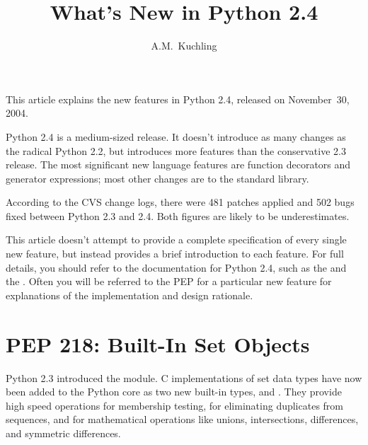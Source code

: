 \documentclass{howto}
\title{What's New in Python 2.4}
\author{A.M.\ Kuchling}
\begin{document}
\maketitle
\tableofcontents

This article explains the new features in Python 2.4, released on
November~30, 2004.

Python 2.4 is a medium-sized release.  It doesn't introduce as many
changes as the radical Python 2.2, but introduces more features than
the conservative 2.3 release.  The most significant new language
features are function decorators and generator expressions; most other
changes are to the standard library.

According to the CVS change logs, there were 481 patches applied and
502 bugs fixed between Python 2.3 and 2.4.  Both figures are likely to
be underestimates.

This article doesn't attempt to provide a complete specification of
every single new feature, but instead provides a brief introduction to
each feature.  For full details, you should refer to the documentation
for Python 2.4, such as the  and the .  Often you will be referred to the PEP for a particular new
feature for explanations of the implementation and design rationale.


\section{PEP 218: Built-In Set Objects}

Python 2.3 introduced the  module.  C implementations of
set data types have now been added to the Python core as two new
built-in types,  and
.  They provide high speed
operations for membership testing, for eliminating duplicates from
sequences, and for mathematical operations like unions, intersections,
differences, and symmetric differences.
\end{document}
